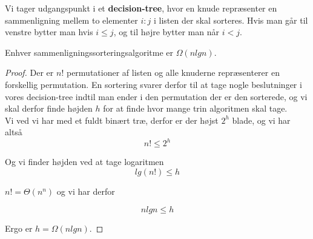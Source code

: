 Vi tager udgangspunkt i et \textbf{decision-tree}, hvor en knude repræsenter en sammenligning mellem to elementer $i:j$ i listen der skal sorteres. Hvis man går til venstre bytter man hvis $i \leq j$, og til højre bytter man når $i < j$.
\begin{theorem}
  Enhver sammenligningssorteringsalgoritme er $\Omega(nlgn)$.
\end{theorem}

\begin{proof}
  Der er $n!$ permutationer af listen og alle knuderne repræsenterer en forskellig permutation. En sortering svarer derfor til at tage nogle beslutninger i vores decision-tree indtil man ender i den permutation der er den sorterede, og vi skal derfor finde højden $h$ for at finde hvor mange trin algoritmen skal tage.\\

  Vi ved vi har med et fuldt binært træ, derfor er der højst $2^h$ blade, og vi har altså
  $$n! \leq 2^h$$

  Og vi finder højden ved at tage logaritmen
  $$lg(n!) \leq h$$

  $n! = \Theta(n^n)$ og vi har derfor

  $$nlgn \leq h$$

  Ergo er $h = \Omega(nlgn)$.
\end{proof}

